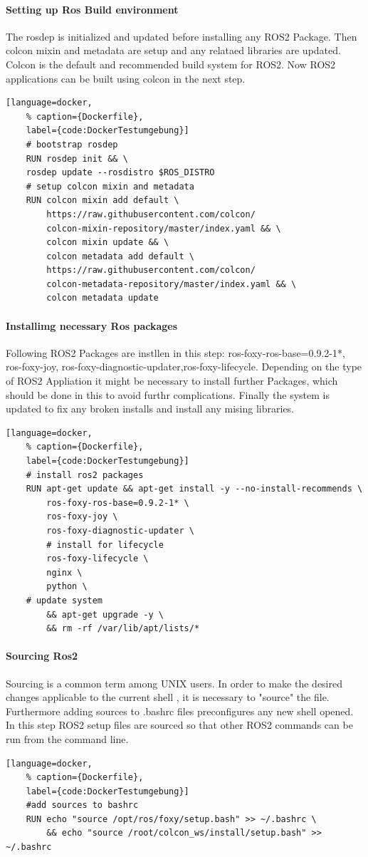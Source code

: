 \paragraph{Setting up Ros Build environment} The rosdep is initialized and updated before installing any ROS2 Package. Then colcon mixin and metadata are setup and any relataed libraries are updated. Colcon is the default and recommended build system for ROS2. Now ROS2 applications can be built using colcon in the next step.
\begin{lstlisting}[language=docker,
	% caption={Dockerfile}, 
	label={code:DockerTestumgebung}]
	# bootstrap rosdep
	RUN rosdep init && \
	rosdep update --rosdistro $ROS_DISTRO
	# setup colcon mixin and metadata
	RUN colcon mixin add default \
		https://raw.githubusercontent.com/colcon/
		colcon-mixin-repository/master/index.yaml && \
		colcon mixin update && \
		colcon metadata add default \
		https://raw.githubusercontent.com/colcon/
		colcon-metadata-repository/master/index.yaml && \
		colcon metadata update
\end{lstlisting}

\paragraph*{Installimg necessary Ros packages} Following ROS2 Packages are instllen in this step: ros-foxy-ros-base=0.9.2-1*, ros-foxy-joy, ros-foxy-diagnostic-updater,ros-foxy-lifecycle. Depending on the type of ROS2 Appliation it might be necessary to install further Packages, which should be done in this to avoid furthr complications. Finally the system is updated to fix any broken installs and install any mising libraries.
\begin{lstlisting}[language=docker,
	% caption={Dockerfile}, 
	label={code:DockerTestumgebung}]
	# install ros2 packages
	RUN apt-get update && apt-get install -y --no-install-recommends \
		ros-foxy-ros-base=0.9.2-1* \
		ros-foxy-joy \
		ros-foxy-diagnostic-updater \
		# install for lifecycle 
		ros-foxy-lifecycle \
		nginx \
		python \
	# update system
		&& apt-get upgrade -y \
		&& rm -rf /var/lib/apt/lists/* 
\end{lstlisting}


\paragraph*{Sourcing Ros2} Sourcing is a common term among UNIX users. In order to make the desired changes applicable to the current shell , it is necessary to "source" the file. Furthermore adding sources to .bashrc files preconfigures any new shell opened. In this step ROS2 setup files are sourced so that other ROS2 commands can be run from the command line. 
\begin{lstlisting}[language=docker,
	% caption={Dockerfile}, 
	label={code:DockerTestumgebung}]
	#add sources to bashrc
	RUN echo "source /opt/ros/foxy/setup.bash" >> ~/.bashrc \
		&& echo "source /root/colcon_ws/install/setup.bash" >> ~/.bashrc
\end{lstlisting}

